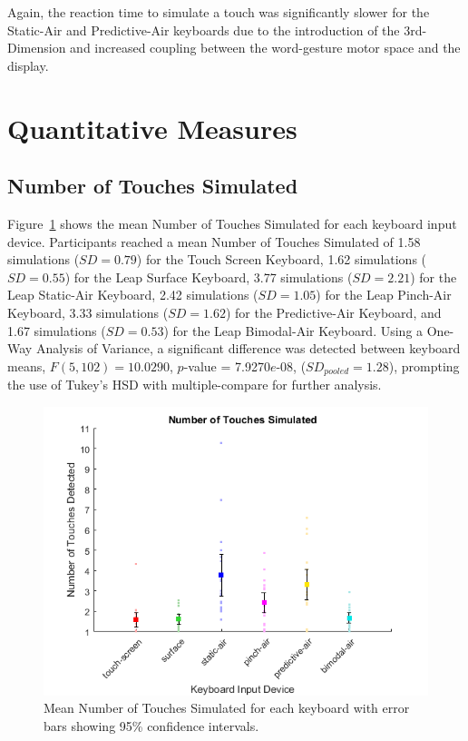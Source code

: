 Again, the reaction time to simulate a touch was significantly slower for the Static-Air and Predictive-Air keyboards due to the introduction of the 3rd-Dimension and increased coupling between the word-gesture motor space and the display.

\section{Quantitative Measures}

\subsection{Number of Touches Simulated}
Figure~\ref{fig_num_touches_mean} shows the mean Number of Touches Simulated for each keyboard input device. Participants reached a mean Number of Touches Simulated of 1.58 simulations ($SD = 0.79$) for the Touch Screen Keyboard, 1.62 simulations ($SD = 0.55$) for the Leap Surface Keyboard, 3.77 simulations ($SD = 2.21$) for the Leap Static-Air Keyboard, 2.42 simulations ($SD = 1.05$) for the Leap Pinch-Air Keyboard, 3.33 simulations ($SD = 1.62$) for the Predictive-Air Keyboard, and 1.67 simulations ($SD = 0.53$) for the Leap Bimodal-Air Keyboard. Using a One-Way Analysis of Variance, a significant difference was detected between keyboard means, $F(5, 102) = 10.0290$, $p$-value = 7.9270$e$-08, ($SD_{pooled} = 1.28$), prompting the use of Tukey's HSD with multiple-compare for further analysis.

\begin{figure}[h]
	\centering
	\includegraphics{fig_num_touches_mean}
	\caption[Mean Number of Touches Simulated]{Mean Number of Touches Simulated for each keyboard with error bars showing 95\% confidence intervals.}
	\label{fig_num_touches_mean}
\end{figure}

